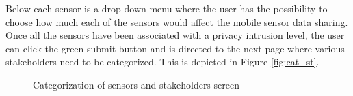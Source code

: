 Below each sensor is a drop down menu where the user has the possibility to choose how much each of the sensors
would affect the mobile sensor data sharing. Once all the sensors have been associated with a privacy intrusion level, the user can click the green submit button and is directed to
the next page where various stakeholders need to be categorized. This is depicted in Figure \ref{fig:cat_st}.

\begin{figure}[htp]
  \hspace{1em}
  \caption{Categorization of sensors and stakeholders screen}
  \label{fig:cat1}
\end{figure}


